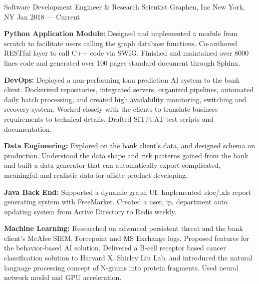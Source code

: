 

\begin{cventries}
	
	\cventry
	{Software Development Engineer \& Research Scientist} %
	{Graphen, Inc} %
	{New York, NY} %
	{Jan 2018 –– Current} %
	{
		\begin{cvitems} %
			\item {\textbf{Python Application Module:} Designed and implemented a module from scratch to facilitate users calling the graph database functions. Co-authored RESTful layer to call C++ code via SWIG. Finished and maintained over 8000 lines code and generated over 100 pages standard document through Sphinx.}
			\item {\textbf{DevOps:} Deployed a non-performing loan prediction AI system to the bank client. Dockerized repositories, integrated servers, organized pipelines, automated daily batch processing, and created high availability monitoring, switching and recovery system. Worked closely with the clients to translate business requirements to technical details. Drafted SIT/UAT test scripts and documentation.}
			\item {\textbf{Data Engineering:} Explored on the bank client's data, and designed schema on production. Understood the data shape and risk patterns gained from the bank and built a data generator that can automatically export complicated, meaningful and realistic data for offsite product developing.}
			\item {\textbf{Java Back End:} Supported a dynamic graph UI. Implemented .doc/.xls report generating system with FreeMarker. Created a user, ip, department auto updating system from Active Directory to Redis weekly.}
			\item {\textbf{Machine Learning:} Researched on advanced persistent threat and the bank client's McAfee SIEM, Forcepoint and MS Exchange logs. Proposed features for the behavior-based AI solution. Delivered a B-cell receptor based cancer classification solution to Harvard X. Shirley Liu Lab, and introduced the natural language processing concept of N-grams into protein fragments. Used neural network model and GPU acceleration.}
		\end{cvitems}
	}


\end{cventries}
